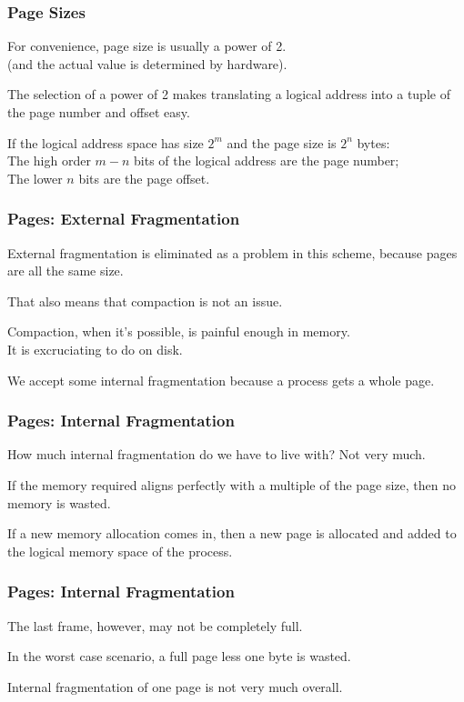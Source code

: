 \begin{frame}
\frametitle{Page Sizes}

For convenience, page size is usually a power of 2.\\
\quad (and the actual value is determined by hardware). 

The selection of a power of 2 makes translating a logical address into a tuple of the page number and offset easy. 

If the logical address space has size $2^{m}$ and the page size is $2^{n}$ bytes:\\
\quad The high order $m - n$ bits of the logical address are the page number;\\
\quad The lower $n$ bits are the page offset. 


\end{frame}

\begin{frame}
\frametitle{Pages: External Fragmentation}

External fragmentation is eliminated as a problem in this scheme, because pages are all the same size. 

That also means that compaction is not an issue. 

Compaction, when it's possible, is painful enough in memory. \\
\quad It is excruciating to do on disk. 

We accept some internal fragmentation because a process gets a whole page. 


\end{frame}

\begin{frame}
\frametitle{Pages: Internal Fragmentation}

How much internal fragmentation do we have to live with? Not very much. 

If the memory required aligns perfectly with a multiple of the page size, then no memory is wasted. 

If a new memory allocation comes in, then a new page is allocated and added to the logical memory space of the process. 

\end{frame}

\begin{frame}
\frametitle{Pages: Internal Fragmentation}

The last frame, however, may not be completely full. 

In the worst case scenario, a full page less one byte is wasted. 

Internal fragmentation of one page is not very much overall.


\end{frame}

